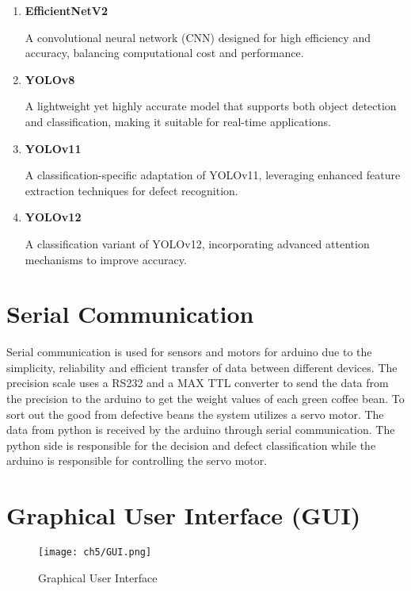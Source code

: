 \begin{enumerate}
	\item \textbf{EfficientNetV2}
	 
	A convolutional neural network (CNN) designed for high efficiency and accuracy, balancing computational cost and performance.
	
	\item \textbf{YOLOv8}
	
	A lightweight yet highly accurate model that supports both object detection and classification, making it suitable for real-time applications.

	\item \textbf{YOLOv11}
	
	A classification-specific adaptation of YOLOv11, leveraging enhanced feature extraction techniques for defect recognition.
	
	\item \textbf{YOLOv12}
	
	A classification variant of YOLOv12, incorporating advanced attention mechanisms to improve accuracy.
\end{enumerate}

\section{Serial Communication}

Serial communication is used for sensors and motors for arduino due to the simplicity, reliability and efficient transfer of data between different devices. The precision scale uses a RS232 and a MAX TTL converter to send the data from the precision to the arduino to get the weight values of each green coffee bean. To sort out the good from defective beans the system utilizes a servo motor. The data from python is received by the arduino through serial communication. The python side is responsible for the decision and defect classification while the arduino is responsible for controlling the servo motor.  

\section{Graphical User Interface (GUI)}

\begin{figure}[h]
    \centering
    \texttt{[image: ch5/GUI.png]} %
    \caption{Graphical User Interface}
    \label{fig:gui}
\end{figure}

